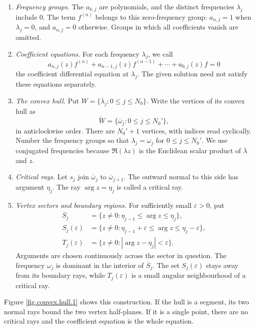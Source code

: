 \documentclass[a4paper,12pt]{article}
\numberwithin{equation}{section}
\begin{document}
\begin{enumerate}
\item \textit{Frequency groups.}
The $a_{k,j}$ are polynomials, and the distinct frequencies $\lambda_j$
include $0$. The term $f^{(n)}$ belongs to this zero-frequency group:
$a_{n,j}=1$ when $\lambda_j=0$, and $a_{n,j}=0$ otherwise.
Groups in which all coefficients vanish are omitted.

\item \textit{Coefficient equations.}
For each frequency $\lambda_j$, we call
\[
 a_{n,j}(z)f^{(n)}+a_{n-1,j}(z)f^{(n-1)}+\cdots+a_{0,j}(z)f=0
\]
the coefficient differential equation at $\lambda_j$.
The given solution need not satisfy these equations separately.

\item \textit{The convex hull.}
Put $W=\{\overline\lambda_j:0\le j\le N_0\}$.
Write the vertices of its convex hull as
\[
 \tilde W=\{\overline\omega_j:0\le j\le N_0'\},
\]
in anticlockwise order. There are $N_0'+1$ vertices, with indices read
cyclically. Number the frequency groups so that $\lambda_j=\omega_j$
for $0\le j\le N_0'$.
We use conjugated frequencies because $\Re(\lambda z)$ is the Euclidean
scalar product of $\overline\lambda$ and $z$.

\item \textit{Critical rays.}
Let $s_j$ join $\overline\omega_j$ to $\overline\omega_{j+1}$.
The outward normal to this side has argument $\eta_j$.
The ray $\arg z=\eta_j$ is called a critical ray.

\item \textit{Vertex sectors and boundary regions.}
For sufficiently small $\varepsilon>0$, put
\[
 \begin{aligned}
 \overline S_j
   &=\{z\ne0:\eta_{j-1}\le\arg z\le\eta_j\},\\
 S_j(\varepsilon)
   &=\{z\ne0:\eta_{j-1}+\varepsilon\le\arg z\le\eta_j-\varepsilon\},\\
 T_j(\varepsilon)
   &=\{z\ne0:|\arg z-\eta_j|<\varepsilon\}.
 \end{aligned}
\]
Arguments are chosen continuously across the sector in question.
The frequency $\omega_j$ is dominant in the interior of $\overline S_j$.
The set $S_j(\varepsilon)$ stays away from its boundary rays, while
$T_j(\varepsilon)$ is a small angular neighbourhood of a critical ray.
\end{enumerate}
Figure \ref{fig.convex.hull.1} shows this construction.
If the hull is a segment, its two normal rays bound the two vertex
half-planes. If it is a single point, there are no critical rays and
the coefficient equation is the whole equation.
\end{document}
